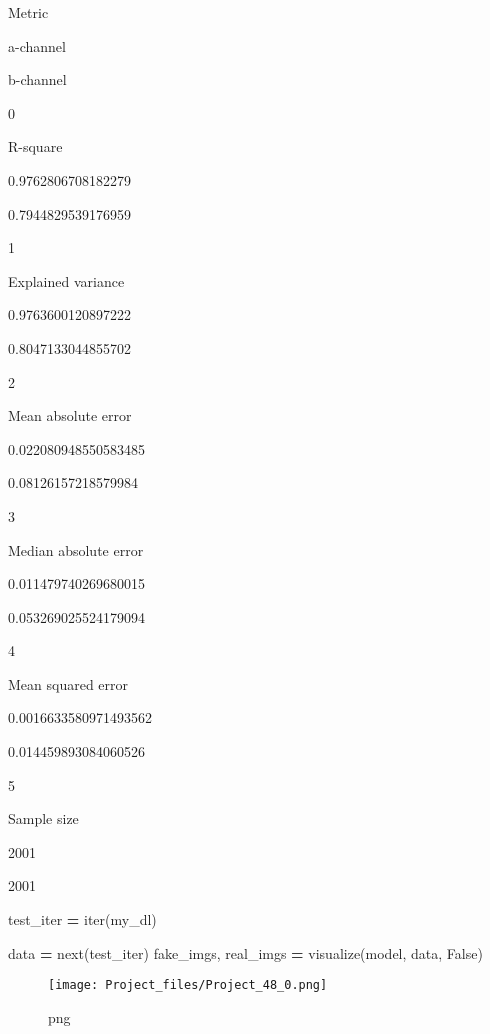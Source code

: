 \documentclass[
]{article}
\newenvironment{Shaded}{\begin{snugshade}}{\end{snugshade}}
\newcommand{\BuiltInTok}[1]{#1}
\newcommand{\NormalTok}[1]{#1}
\newcommand{\OperatorTok}[1]{\textcolor[rgb]{0.81,0.36,0.00}{\textbf{#1}}}
\newcommand{\VariableTok}[1]{\textcolor[rgb]{0.00,0.00,0.00}{#1}}
\begin{document}
Metric

a-channel

b-channel

0

R-square

0.9762806708182279

0.7944829539176959

1

Explained variance

0.9763600120897222

0.8047133044855702

2

Mean absolute error

0.022080948550583485

0.08126157218579984

3

Median absolute error

0.011479740269680015

0.053269025524179094

4

Mean squared error

0.0016633580971493562

0.014459893084060526

5

Sample size

2001

2001

\begin{Shaded}
\begin{Highlighting}[]
\NormalTok{test\_iter }\OperatorTok{=} \BuiltInTok{iter}\NormalTok{(my\_dl)}
\end{Highlighting}
\end{Shaded}

\begin{Shaded}
\begin{Highlighting}[]
\NormalTok{data }\OperatorTok{=} \BuiltInTok{next}\NormalTok{(test\_iter)}
\NormalTok{fake\_imgs, real\_imgs }\OperatorTok{=}\NormalTok{ visualize(model, data, }\VariableTok{False}\NormalTok{)}
\end{Highlighting}
\end{Shaded}

\begin{figure}
\centering
\texttt{[image: Project\_files/Project\_48\_0.png]}
\caption{png}
\end{figure}
\end{document}
